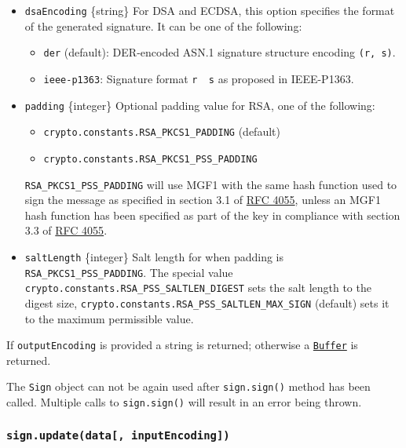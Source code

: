 \begin{itemize}
\item
  \texttt{dsaEncoding} \{string\} For DSA and ECDSA, this option
  specifies the format of the generated signature. It can be one of the
  following:

  \begin{itemize}
  \tightlist
  \item
    \texttt{\textquotesingle{}der\textquotesingle{}} (default):
    DER-encoded ASN.1 signature structure encoding \texttt{(r,\ s)}.
  \item
    \texttt{\textquotesingle{}ieee-p1363\textquotesingle{}}: Signature
    format \texttt{r\ \textbar{}\textbar{}\ s} as proposed in
    IEEE-P1363.
  \end{itemize}
\item
  \texttt{padding} \{integer\} Optional padding value for RSA, one of
  the following:

  \begin{itemize}
  \tightlist
  \item
    \texttt{crypto.constants.RSA\_PKCS1\_PADDING} (default)
  \item
    \texttt{crypto.constants.RSA\_PKCS1\_PSS\_PADDING}
  \end{itemize}

  \texttt{RSA\_PKCS1\_PSS\_PADDING} will use MGF1 with the same hash
  function used to sign the message as specified in section 3.1 of
  \href{https://www.rfc-editor.org/rfc/rfc4055.txt}{RFC 4055}, unless an
  MGF1 hash function has been specified as part of the key in compliance
  with section 3.3 of
  \href{https://www.rfc-editor.org/rfc/rfc4055.txt}{RFC 4055}.
\item
  \texttt{saltLength} \{integer\} Salt length for when padding is
  \texttt{RSA\_PKCS1\_PSS\_PADDING}. The special value
  \texttt{crypto.constants.RSA\_PSS\_SALTLEN\_DIGEST} sets the salt
  length to the digest size,
  \texttt{crypto.constants.RSA\_PSS\_SALTLEN\_MAX\_SIGN} (default) sets
  it to the maximum permissible value.
\end{itemize}

If \texttt{outputEncoding} is provided a string is returned; otherwise a
\href{buffer.md}{\texttt{Buffer}} is returned.

The \texttt{Sign} object can not be again used after
\texttt{sign.sign()} method has been called. Multiple calls to
\texttt{sign.sign()} will result in an error being thrown.

\subsubsection{\texorpdfstring{\texttt{sign.update(data{[},\ inputEncoding{]})}}{sign.update(data{[}, inputEncoding{]})}}\label{sign.updatedata-inputencoding}

